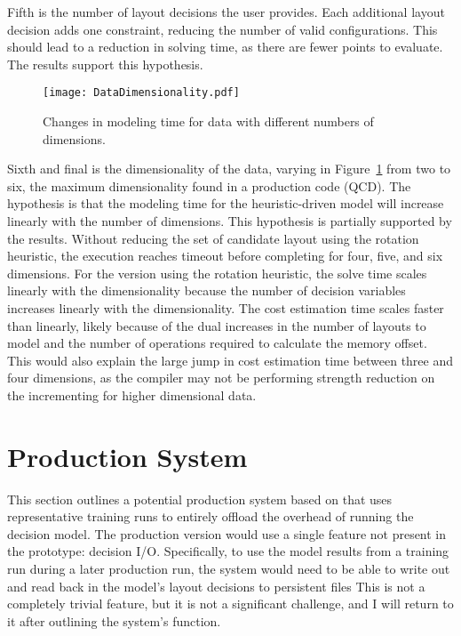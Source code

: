 Fifth is the number of layout decisions the user provides. 
Each additional layout decision adds one constraint, reducing the number of valid configurations. 
This should lead to a reduction in solving time, as there are fewer points to evaluate.
The results support this hypothesis.


\begin{figure}
	\texttt{[image: DataDimensionality.pdf]}
	\caption{Changes in modeling time for data with different numbers of dimensions.}\label{DataDimensionality}
\end{figure}
Sixth and final is the dimensionality of the data, varying in Figure~\ref{DataDimensionality} from two to six, the maximum dimensionality found in a production code (QCD).
The hypothesis is that the modeling time for the heuristic-driven model will increase linearly with the number of dimensions.
This hypothesis is partially supported by the results.
Without reducing the set of candidate layout using the rotation heuristic, the execution reaches timeout before completing for four, five, and six dimensions.
For the version using the rotation heuristic, the solve time scales linearly with the dimensionality because the number of decision variables increases linearly with the dimensionality.
The cost estimation time scales faster than linearly, likely because of the dual increases in the number of layouts to model and the number of operations required to calculate the memory offset. 
This would also explain the large jump in cost estimation time between three and four dimensions, as the compiler may not be performing strength reduction on the incrementing for higher dimensional data.

\section{Production System}

This section outlines a potential production system based on \FormatDecisions{} that uses representative training runs to entirely offload the overhead of running the decision model.
The production version would use a single feature not present in the prototype: decision I/O.
Specifically, to use the model results from a training run during a later production run, the system would need to be able to write out and read back in the model's layout decisions to persistent files 
This is not a completely trivial feature, but it is not a significant challenge, and I will return to it after outlining the system's function.

